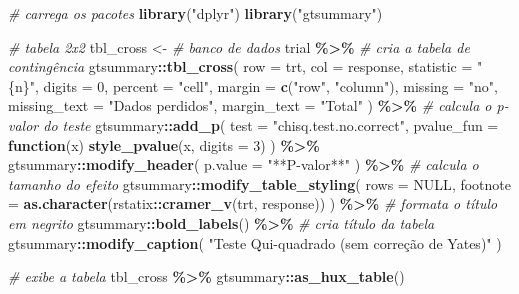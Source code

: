 \documentclass[
  a4paper,
]{book}
\newenvironment{Shaded}{\begin{snugshade}}{\end{snugshade}}
\newcommand{\AttributeTok}[1]{\textcolor[rgb]{0.13,0.29,0.53}{#1}}
\newcommand{\CommentTok}[1]{\textcolor[rgb]{0.56,0.35,0.01}{\textit{#1}}}
\newcommand{\ConstantTok}[1]{\textcolor[rgb]{0.56,0.35,0.01}{#1}}
\newcommand{\ControlFlowTok}[1]{\textcolor[rgb]{0.13,0.29,0.53}{\textbf{#1}}}
\newcommand{\DecValTok}[1]{\textcolor[rgb]{0.00,0.00,0.81}{#1}}
\newcommand{\FunctionTok}[1]{\textcolor[rgb]{0.13,0.29,0.53}{\textbf{#1}}}
\newcommand{\NormalTok}[1]{#1}
\newcommand{\OtherTok}[1]{\textcolor[rgb]{0.56,0.35,0.01}{#1}}
\newcommand{\SpecialCharTok}[1]{\textcolor[rgb]{0.81,0.36,0.00}{\textbf{#1}}}
\newcommand{\StringTok}[1]{\textcolor[rgb]{0.31,0.60,0.02}{#1}}
\begin{document}
\begin{Shaded}
\begin{Highlighting}[]
\CommentTok{\# carrega os pacotes}
\FunctionTok{library}\NormalTok{(}\StringTok{"dplyr"}\NormalTok{)}
\FunctionTok{library}\NormalTok{(}\StringTok{"gtsummary"}\NormalTok{)}

\CommentTok{\# tabela 2x2}
\NormalTok{tbl\_cross }\OtherTok{\textless{}{-}}
  \CommentTok{\# banco de dados}
\NormalTok{  trial }\SpecialCharTok{\%\textgreater{}\%}
  \CommentTok{\# cria a tabela de contingência}
\NormalTok{  gtsummary}\SpecialCharTok{::}\FunctionTok{tbl\_cross}\NormalTok{(}
    \AttributeTok{row =}\NormalTok{ trt,}
    \AttributeTok{col =}\NormalTok{ response,}
    \AttributeTok{statistic =} \StringTok{"\{n\}"}\NormalTok{,}
    \AttributeTok{digits =} \DecValTok{0}\NormalTok{,}
    \AttributeTok{percent =} \StringTok{"cell"}\NormalTok{,}
    \AttributeTok{margin =} \FunctionTok{c}\NormalTok{(}\StringTok{"row"}\NormalTok{, }\StringTok{"column"}\NormalTok{),}
    \AttributeTok{missing =} \StringTok{"no"}\NormalTok{,}
    \AttributeTok{missing\_text =} \StringTok{"Dados perdidos"}\NormalTok{,}
    \AttributeTok{margin\_text =} \StringTok{"Total"}
\NormalTok{  ) }\SpecialCharTok{\%\textgreater{}\%}
  \CommentTok{\# calcula o p{-}valor do teste}
\NormalTok{  gtsummary}\SpecialCharTok{::}\FunctionTok{add\_p}\NormalTok{(}
    \AttributeTok{test =} \StringTok{"chisq.test.no.correct"}\NormalTok{,}
    \AttributeTok{pvalue\_fun =} \ControlFlowTok{function}\NormalTok{(x) }\FunctionTok{style\_pvalue}\NormalTok{(x, }\AttributeTok{digits =} \DecValTok{3}\NormalTok{)}
\NormalTok{  ) }\SpecialCharTok{\%\textgreater{}\%}
\NormalTok{  gtsummary}\SpecialCharTok{::}\FunctionTok{modify\_header}\NormalTok{(}
    \AttributeTok{p.value =} \StringTok{"**P{-}valor**"}
\NormalTok{  ) }\SpecialCharTok{\%\textgreater{}\%}
  \CommentTok{\# calcula o tamanho do efeito}
\NormalTok{  gtsummary}\SpecialCharTok{::}\FunctionTok{modify\_table\_styling}\NormalTok{(}
    \AttributeTok{rows =} \ConstantTok{NULL}\NormalTok{,}
    \AttributeTok{footnote =} \FunctionTok{as.character}\NormalTok{(rstatix}\SpecialCharTok{::}\FunctionTok{cramer\_v}\NormalTok{(trt, response))}
\NormalTok{  ) }\SpecialCharTok{\%\textgreater{}\%}
  \CommentTok{\# formata o título em negrito}
\NormalTok{  gtsummary}\SpecialCharTok{::}\FunctionTok{bold\_labels}\NormalTok{() }\SpecialCharTok{\%\textgreater{}\%}
  \CommentTok{\# cria título da tabela}
\NormalTok{  gtsummary}\SpecialCharTok{::}\FunctionTok{modify\_caption}\NormalTok{(}
    \StringTok{"Teste Qui{-}quadrado (sem correção de Yates)"}
\NormalTok{  )}

\CommentTok{\# exibe a tabela}
\NormalTok{tbl\_cross }\SpecialCharTok{\%\textgreater{}\%}
\NormalTok{  gtsummary}\SpecialCharTok{::}\FunctionTok{as\_hux\_table}\NormalTok{()}
\end{Highlighting}
\end{Shaded}
\end{document}
